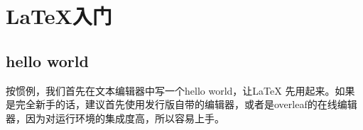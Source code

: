 \chapter{\LaTeX 入门}
\section{hello world}
按惯例，我们首先在文本编辑器中写一个hello world，让\LaTeX
先用起来。如果是完全新手的话，建议首先使用发行版自带的编辑器，或者是overleaf的在线编辑器，因为对运行环境的集成度高，所以容易上手。

